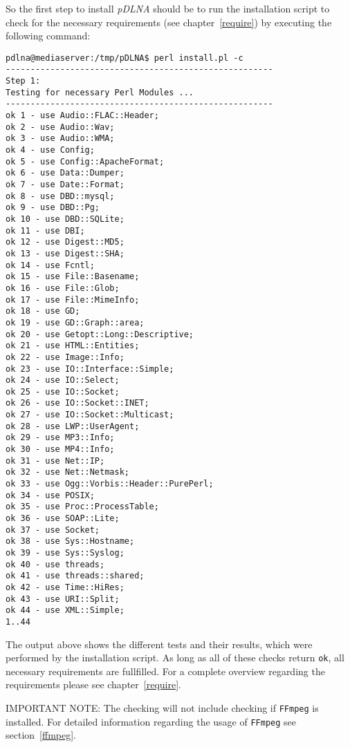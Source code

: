 So the first step to install {\em pDLNA} should be to run the installation script to check for the necessary requirements (see chapter~\ref{require}) by executing the following command:
\begin{lstlisting}
pdlna@mediaserver:/tmp/pDLNA$ perl install.pl -c
------------------------------------------------------
Step 1:
Testing for necessary Perl Modules ...
------------------------------------------------------
ok 1 - use Audio::FLAC::Header;
ok 2 - use Audio::Wav;
ok 3 - use Audio::WMA;
ok 4 - use Config;
ok 5 - use Config::ApacheFormat;
ok 6 - use Data::Dumper;
ok 7 - use Date::Format;
ok 8 - use DBD::mysql;
ok 9 - use DBD::Pg;
ok 10 - use DBD::SQLite;
ok 11 - use DBI;
ok 12 - use Digest::MD5;
ok 13 - use Digest::SHA;
ok 14 - use Fcntl;
ok 15 - use File::Basename;
ok 16 - use File::Glob;
ok 17 - use File::MimeInfo;
ok 18 - use GD;
ok 19 - use GD::Graph::area;
ok 20 - use Getopt::Long::Descriptive;
ok 21 - use HTML::Entities;
ok 22 - use Image::Info;
ok 23 - use IO::Interface::Simple;
ok 24 - use IO::Select;
ok 25 - use IO::Socket;
ok 26 - use IO::Socket::INET;
ok 27 - use IO::Socket::Multicast;
ok 28 - use LWP::UserAgent;
ok 29 - use MP3::Info;
ok 30 - use MP4::Info;
ok 31 - use Net::IP;
ok 32 - use Net::Netmask;
ok 33 - use Ogg::Vorbis::Header::PurePerl;
ok 34 - use POSIX;
ok 35 - use Proc::ProcessTable;
ok 36 - use SOAP::Lite;
ok 37 - use Socket;
ok 38 - use Sys::Hostname;
ok 39 - use Sys::Syslog;
ok 40 - use threads;
ok 41 - use threads::shared;
ok 42 - use Time::HiRes;
ok 43 - use URI::Split;
ok 44 - use XML::Simple;
1..44
\end{lstlisting}
The output above shows the different tests and their results, which were performed by the installation script. As long as all of these checks return \verb|ok|, all necessary requirements are fullfilled. For a complete overview regarding the requirements please see chapter~\ref{require}.

\begin{colframeimportantnote}
\textsc{IMPORTANT NOTE:} The checking will not include checking if \verb|FFmpeg| is installed. For detailed information regarding the usage of \verb|FFmpeg| see section~\ref{ffmpeg}.
\end{colframeimportantnote}

